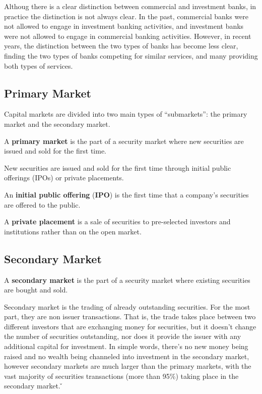 Althoug there is a clear distinction between commercial and investment banks, in practice the distinction is not always
clear. In the past, commercial banks were not allowed to engage in investment banking activities, and investment banks
were not allowed to engage in commercial banking activities. However, in recent years, the distinction between the two
types of banks has become less clear, finding the two types of banks competing for similar services, and many providing
both types of services.

\subsection{Primary Market}

Capital markets are divided into two main types of ``submarkets'': the primary market and the secondary market.

A \textbf{primary market} is the part of a security market where new securities are issued and sold for the first time.
\ed

New securities are issued and sold for the first time through initial public offerings (IPOs) or private placements.

An \textbf{initial public offering} (\textbf{IPO}) is the first time that a company's securities are offered to the
public.
\ed

A \textbf{private placement} is a sale of securities to pre-selected investors and institutions rather than on the
open market.
\ed

\subsection{Secondary Market}

A \textbf{secondary market} is the part of a security market where existing securities are bought and sold.
\ed

Secondary market is the trading of already outstanding securities. For the most part, they are non issuer
transactions. That is, the trade takes place between two different investors that are exchanging money for securities,
but it doesn't change the number of securities outstanding, nor does it provide the issuer with any additional
capital for investment. In simple words, there's no new money being raised and no wealth being channeled into
investment in the secondary market, however secondary markets are much larger than the primary markets, with the vast
majority of securities transactions (more than 95\%) taking place in the secondary market. \v


